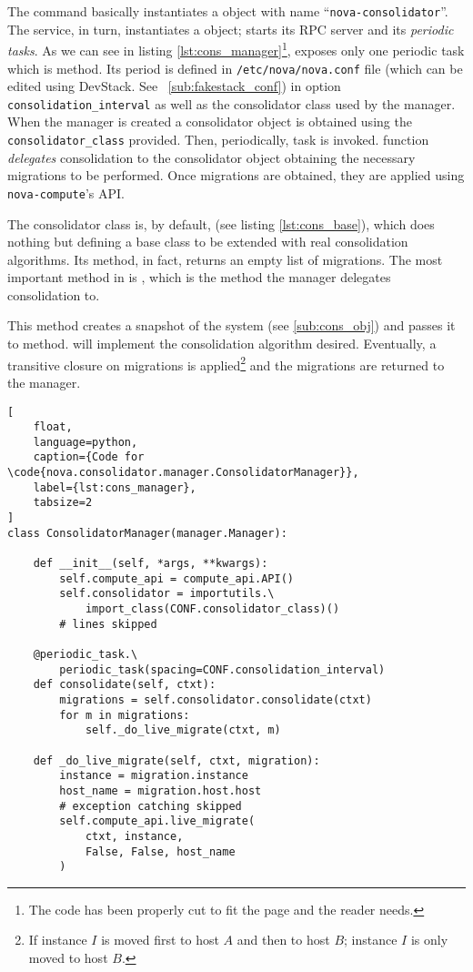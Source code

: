 The command basically instantiates a  object with name ``\texttt{nova-consolidator}''. The service, in turn, instantiates a  object; starts its RPC server and its \emph{periodic tasks}. As we can see in listing \ref{lst:cons_manager}\footnote{\label{note:cons_code}The code has been properly cut to fit the page and the reader needs.},  exposes only one periodic task which is  method.
Its period is defined in \texttt{/etc/nova/nova.conf} file (which can be edited using DevStack. See ~\ref{sub:fakestack_conf}) in option \texttt{consolidation\_interval} as well as the consolidator class used by the manager. When the manager is created a consolidator object is obtained using the \texttt{consolidator\_class} provided. Then, periodically,  task is invoked.  function \emph{delegates} consolidation to the consolidator object obtaining the necessary migrations to be performed. Once migrations are obtained, they are applied using \texttt{nova-compute}'s API.

The consolidator class is, by default,  (see listing \ref{lst:cons_base}), which does nothing but defining a base class to be extended with real consolidation algorithms. Its  method, in fact, returns an empty list of migrations. The most important method in  is , which is the method the manager delegates consolidation to.

This method creates a snapshot of the system (see \ref{sub:cons_obj}) and passes it to  method.  will implement the consolidation algorithm desired. Eventually, a transitive closure on migrations is applied\footnote{If instance $I$ is moved first to host $A$ and then to host $B$; instance $I$ is only moved to host $B$.} and the migrations are returned to the manager.

\begin{lstlisting}[
	float,
	language=python,
	caption={Code for \code{nova.consolidator.manager.ConsolidatorManager}},
	label={lst:cons_manager},
	tabsize=2
]
class ConsolidatorManager(manager.Manager):

	def __init__(self, *args, **kwargs):
		self.compute_api = compute_api.API()
		self.consolidator = importutils.\
			import_class(CONF.consolidator_class)()
		# lines skipped

	@periodic_task.\
		periodic_task(spacing=CONF.consolidation_interval)
	def consolidate(self, ctxt):
		migrations = self.consolidator.consolidate(ctxt)
		for m in migrations:
			self._do_live_migrate(ctxt, m)

	def _do_live_migrate(self, ctxt, migration):
		instance = migration.instance
		host_name = migration.host.host
		# exception catching skipped
		self.compute_api.live_migrate(
			ctxt, instance,
			False, False, host_name
		)
\end{lstlisting}

